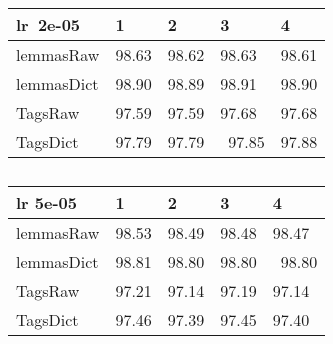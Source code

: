 \begin{table}
\centering
\caption{}
\begin{tabular}{l|llll}
\multicolumn{1}{l}{\textbf{lr~2e-05}} & 1     & 2     & 3      & 4      \\ 
\hline\hline
lemmasRaw                    & 98.63 & 98.62 & 98.63  & 98.61  \\ 
\hline
lemmasDict                   & 98.90 & 98.89 & 98.91  & 98.90  \\ 
\hline
TagsRaw                      & 97.59 & 97.59 & 97.68  & 97.68  \\ 
\hline
TagsDict                     & 97.79 & 97.79 & ~97.85 & 97.88  \\
\hline
\end{tabular}
\end{table}

\begin{table}
\centering
\caption{}
\begin{tabular}{l|llll}
\multicolumn{1}{l}{lr 5e-05} & 1     & 2     & 3     & 4       \\ 
\hline\hline
lemmasRaw                    & 98.53 & 98.49 & 98.48 & 98.47   \\ 
\hline
lemmasDict                   & 98.81 & 98.80 & 98.80 & ~98.80  \\ 
\hline
TagsRaw                      & 97.21 & 97.14 & 97.19 & 97.14   \\ 
\hline
TagsDict                     & 97.46 & 97.39 & 97.45 & 97.40   \\
\hline
\end{tabular}
\end{table}




